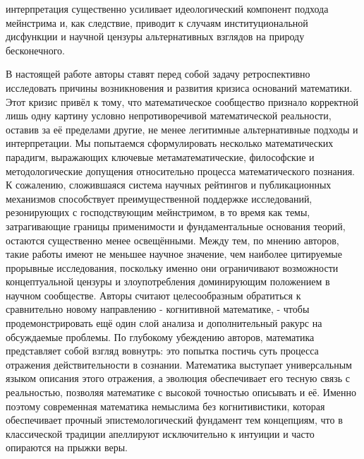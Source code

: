 \documentclass[12pt]{article}
\begin{document}
интерпретация существенно усиливает идеологический компонент подхода мейнстрима и, как следствие, приводит к случаям институциональной дисфункции и научной цензуры альтернативных взглядов на природу бесконечного.

В настоящей работе авторы ставят перед собой задачу ретроспективно исследовать причины возникновения и развития кризиса оснований математики. Этот кризис привёл к тому, что математическое сообщество признало корректной лишь одну картину условно непротиворечивой математической реальности, оставив за её пределами другие, не менее легитимные альтернативные подходы и интерпретации. Мы попытаемся сформулировать несколько математических парадигм, выражающих ключевые метаматематические, философские и методологические допущения относительно процесса математического познания. К сожалению, сложившаяся система научных рейтингов и публикационных механизмов способствует преимущественной поддержке исследований, резонирующих с господствующим мейнстримом, в то время как темы, затрагивающие границы применимости и фундаментальные основания теорий, остаются существенно менее освещёнными. Между тем, по мнению авторов, такие работы имеют не меньшее научное значение, чем наиболее цитируемые прорывные исследования, поскольку именно они ограничивают возможности концептуальной цензуры и злоупотребления доминирующим положением в научном сообществе. Авторы считают целесообразным обратиться к сравнительно новому направлению - когнитивной математике, - чтобы продемонстрировать ещё один слой анализа и дополнительный ракурс на обсуждаемые проблемы. По глубокому убеждению авторов, математика представляет собой взгляд вовнутрь: это попытка постичь суть процесса отражения действительности в сознании. Математика выступает универсальным языком описания этого отражения, а эволюция обеспечивает его тесную связь с реальностью, позволяя математике с высокой точностью описывать и её. Именно поэтому современная математика немыслима без когнитивистики, которая обеспечивает прочный эпистемологический фундамент тем концепциям, что в классической традиции апеллируют исключительно к интуиции и часто опираются на прыжки веры. 
\end{document}
